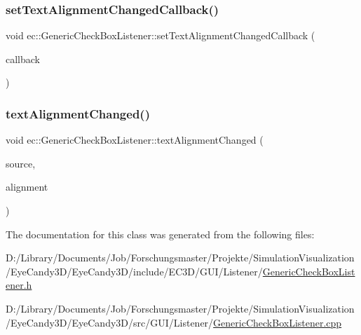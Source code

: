 \subsubsection{\texorpdfstring{set\+Text\+Alignment\+Changed\+Callback()}{setTextAlignmentChangedCallback()}}
{\footnotesize\ttfamily void ec\+::\+Generic\+Check\+Box\+Listener\+::set\+Text\+Alignment\+Changed\+Callback (\begin{DoxyParamCaption}\item[{const \mbox{\hyperlink{classec_1_1_generic_check_box_listener_ab297fca8dea2b6edefe0c8d97c24c090}{Text\+Alignment\+Changed\+\_\+\+Callback}} \&}]{callback }\end{DoxyParamCaption})}

\mbox{\label{classec_1_1_generic_check_box_listener_abe00afb238e730d9e88c14e540f209ca}} 
\subsubsection{\texorpdfstring{text\+Alignment\+Changed()}{textAlignmentChanged()}}
{\footnotesize\ttfamily void ec\+::\+Generic\+Check\+Box\+Listener\+::text\+Alignment\+Changed (\begin{DoxyParamCaption}\item[{agui\+::\+Check\+Box $\ast$}]{source,  }\item[{agui\+::\+Area\+Alignment\+Enum}]{alignment }\end{DoxyParamCaption})\hspace{0.3cm}{\ttfamily [override]}}



The documentation for this class was generated from the following files\+:\begin{DoxyCompactItemize}
\item 
D\+:/\+Library/\+Documents/\+Job/\+Forschungsmaster/\+Projekte/\+Simulation\+Visualization/\+Eye\+Candy3\+D/\+Eye\+Candy3\+D/include/\+E\+C3\+D/\+G\+U\+I/\+Listener/\mbox{\hyperlink{_generic_check_box_listener_8h}{Generic\+Check\+Box\+Listener.\+h}}\item 
D\+:/\+Library/\+Documents/\+Job/\+Forschungsmaster/\+Projekte/\+Simulation\+Visualization/\+Eye\+Candy3\+D/\+Eye\+Candy3\+D/src/\+G\+U\+I/\+Listener/\mbox{\hyperlink{_generic_check_box_listener_8cpp}{Generic\+Check\+Box\+Listener.\+cpp}}\end{DoxyCompactItemize}
